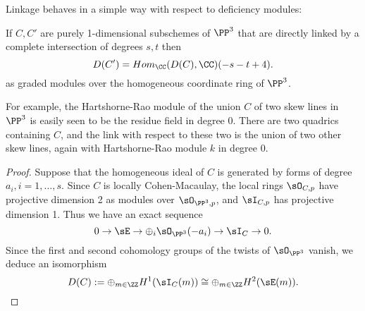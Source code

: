 Linkage behaves in a simple way with respect to deficiency modules:

\begin{theorem}\label{HR}
If $C,C'$ are purely 1-dimensional subschemes of $\PP^3$ that are directly linked by a complete intersection of degrees $s,t$ then
$$
D(C') = Hom_\CC(D(C), \CC) (-s-t+4).
$$ 
as graded modules over the homogeneous coordinate ring of $\PP^3$.
\end{theorem}

For example, the Hartshorne-Rao module of the union $C$ of two skew lines in $\PP^3$ is easily seen to be the residue field in degree 0. There are
two quadrics containing $C$, and the link with respect to these two is the union of two other skew lines, again with Hartshorne-Rao module
$k$ in degree 0.

\begin{proof}
Suppose that the homogeneous ideal of $C$ is generated by forms of degree $a_i, i=1,\dots,s$. Since $C$ is locally Cohen-Macaulay,
the local rings $\sO_{C,p}$ have projective dimension 2 as modules over $\sO_{\PP^3, p}$, and $\sI_{C,p}$ has projective dimension 1.
Thus we have an exact sequence
$$
0\to \sE \to \oplus_i\sO_{\PP^3}(-a_i) \to \sI_C \to 0.
$$
Since the first and second cohomology groups of the twists of $\sO_{\PP^3}$ vanish, we deduce an isomorphism
$$
D(C) := \oplus_{m\in \ZZ} H^1(\sI_C(m)) \cong \oplus_{m\in \ZZ} H^2(\sE(m)).
$$


\end{proof}
